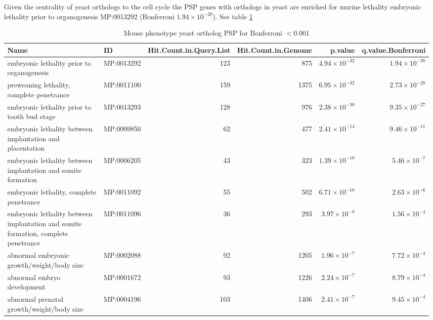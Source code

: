 Given the centrality of yeast orthologs to the cell cycle the PSP genes with orthologs in yeast are enriched for murine lethality embryonic lethality prior to organogenesis  MP:0013292 (Bonferroni $1.94 \times 10^{-28}$). See table \ref{Table:Mouse phenotype yeast ortholog PSPfor Bonferroni < 0.001}
\begin{table}[ht]
\centering
\begin{adjustbox}{width=1\textwidth}
\begin{tabular}{llrrrr}
  \hline
Name & ID & Hit.Count.in.Query.List & Hit.Count.in.Genome & p.value & q.value.Bonferroni \\ 
  \hline
embryonic lethality prior to organogenesis & MP:0013292 & 123 & 875 & $4.94 \times 10^{-32}$ & $1.94 \times 10^{-28}$ \\ 
  preweaning lethality, complete penetrance & MP:0011100 & 159 & 1375 & $6.95 \times 10^{-32}$ & $2.73 \times 10^{-28}$ \\ 
  embryonic lethality prior to tooth bud stage & MP:0013293 & 128 & 976 & $2.38 \times 10^{-30}$ & $9.35 \times 10^{-27}$ \\ 
  embryonic lethality between implantation and placentation & MP:0009850 & 62 & 477 & $2.41 \times 10^{-14}$ & $9.46 \times 10^{-11}$ \\ 
  embryonic lethality between implantation and somite formation & MP:0006205 & 43 & 323 & $1.39 \times 10^{-10}$ & $5.46 \times 10^{-7}$ \\ 
  embryonic lethality, complete penetrance & MP:0011092 & 55 & 502 & $6.71 \times 10^{-10}$ & $2.63 \times 10^{-6}$ \\ 
  embryonic lethality between implantation and somite formation, complete penetrance & MP:0011096 & 36 & 293 & $3.97 \times 10^{-8}$ & $1.56 \times 10^{-4}$ \\ 
  abnormal embryonic growth/weight/body size & MP:0002088 & 92 & 1205 & $1.96 \times 10^{-7}$ & $7.72 \times 10^{-4}$ \\ 
  abnormal embryo development & MP:0001672 & 93 & 1226 & $2.24 \times 10^{-7}$ & $8.79 \times 10^{-4}$ \\ 
  abnormal prenatal growth/weight/body size & MP:0004196 & 103 & 1406 & $2.41 \times 10^{-7}$ & $9.45 \times 10^{-4}$ \\ 
   \hline
\end{tabular}
\end{adjustbox}
\caption{Mouse phenotype yeast ortholog PSP for Bonferroni $< 0.001$} 
\label{Table:Mouse phenotype yeast ortholog PSPfor Bonferroni < 0.001}
\end{table}
